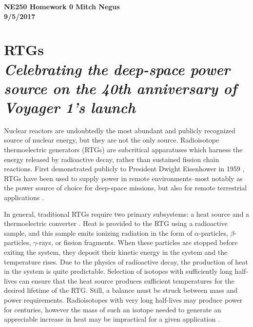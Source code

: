 \documentclass{article}
\newcommand{\tab}{\-\hspace{1cm}}
\begin{document}
\thispagestyle{empty}

{\bf {\large {NE250 Homework {0} \hfill Mitch Negus\\
		\hspace*{\fill} 9/5/2017\\ }}}
\section*{RTGs\\\textsl{\normalsize Celebrating the deep-space power source on the 40th anniversary of Voyager 1's launch}}

\begin{multicols}{2}

\tab Nuclear reactors are undoubtedly the most abundant and publicly recognized source of nuclear energy, but they are not the only source. Radioisotope thermoelectric generators (RTGs) are subcritical apparatuses which harness the energy released by radioactive decay, rather than sustained fission chain reactions. First demonstrated publicly to President Dwight Eisenhower in 1959 \cite{rowe}, RTGs have been used to supply power in remote environments--most notably as the power source of choice for deep-space missions, but also for remote terrestrial applications \cite{lange}. 

\tab In general, traditional RTGs require two primary subsystems: a heat source and a thermoelectric converter \cite{rowe,lange}. Heat is provided to the RTG using a radioactive sample, and this sample emits ionizing radiation in the form of $\alpha$-particles, $\beta$-particles, $\gamma$-rays, or fission fragments. When these particles are stopped before exiting the system, they deposit their kinetic energy in the system and the temperature rises. Due to the physics of radioactive decay, the production of heat in the system is quite predictable. Selection of isotopes with sufficiently long half-lives can ensure that the heat source produces sufficient temperatures for the desired lifetime of the RTG. Still, a balance must be struck between mass and power requirements. Radioisotopes with very long half-lives may produce power for centuries, however the mass of such an isotope needed to generate an appreciable increase in heat may be impractical for a given application \cite{lange}.


\end{multicols}
\end{document}
